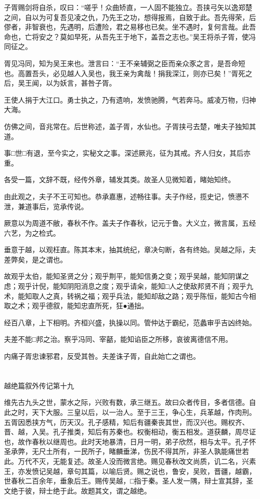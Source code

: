 \documentclass[12pt,UTF8]{ctexbook}
\begin{document}
子胥赐剑将自杀，叹曰：“嗟乎！众曲矫直，一人固不能独立。吾挟弓矢以逸郑楚之间，自以为可复吾见凌之仇，乃先王之功，想得报焉，自致于此。吾先得荣，后僇者，非智衰也，先遇明，后遭险，君之易移也已矣。坐不遇时，复何言哉。此吾命也，亡将安之？莫如早死，从吾先王于地下，盖吾之志也。”吴王将杀子胥，使冯同征之。

胥见冯同，知为吴王来也。泄言曰：“王不亲辅弼之臣而亲众豕之言，是吾命短也。高置吾头，必见越人入吴也，我王亲为禽哉！捐我深江，则亦已矣！”胥死之后，吴王闻，以为妖言，甚咎子胥。

王使人捐于大江口。勇士执之，乃有遗响，发愤驰腾，气若奔马。威凌万物，归神大海。

仿佛之间，音兆常在。后世称述，盖子胥，水仙也。子胥挟弓去楚，唯夫子独知其道。

事□世□有退，至今实之，实秘文之事。深述厥兆，征为其戒。齐人归女，其后亦重。

各受一篇，文辞不既，经传外章，辅发其类。故圣人见微知着，睹始知终。

由此观之，夫子不王可知也。恭承嘉惠，述畅往事。夫子作经，揽史记，愤懑不泄，兼道事后，览承传说。

厥意以为周道不敝，春秋不作。盖夫子作春秋，记元于鲁。大义立，微言属，五经六艺，为之检式。

垂意于越，以观枉直。陈其本末，抽其统纪，章决句断，各有终始。吴越之际，夫差弊矣，是之谓也。

故观乎太伯，能知圣贤之分；观乎荆平，能知信勇之变；观乎吴越，能知阴谋之虑；观乎计倪，能知阴阳消息之度；观乎请籴，能知□人之使敌邦贤不肖；观乎九术，能知取人之真，转祸之福；观乎兵法，能知却敌之路；观乎陈恒，能知古今相取之术；观乎德叙，能知忠直所死，狂●通拙。

经百八章，上下相明。齐桓兴盛，执操以同。管仲达于霸纪，范蠡审乎吉凶终始。

夫差不能□邦之治。察乎冯同、宰嚭，能知谄臣之所移，哀彼离德信不用。

内痛子胥忠谏邪君，反受其咎。夫差诛子胥，自此始亡之谓也。


\part{}

越绝篇叙外传记第十九

维先古九头之世，蒙水之际，兴败有数，承三继五。故曰众者传目，多者信德。自此之时，天下大服。三皇以后，以一治人。至于三王，争心生，兵革越，作肉刑。五胥因悉挟方气，历天汉。孔子感精，知后有疆秦丧其世，而汉兴也。赐权齐、晋、越，入吴。孔子推类，知后有苏秦也。权衡相动，衡五相发。道获麟，周尽证也，故作春秋以继周也。此时天地暴清，日月一明，弟子欣然，相与太平。孔子怀圣承弊，无尺土所有，一民所子，睹麟垂涕，伤民不得其所，非圣人孰能痛世若此。万代不灭，无能复述。故圣人没而微言绝。赐见春秋改文尚质，讥二名，兴素王，亦发愤记吴越，章句其篇，以喻后贤。赐之说也，鲁安，吴败，晋疆，越霸，世春秋二百余年，垂象后王。赐传吴越，□指于秦。圣人发一隅，辩士宣其辞，圣文绝于彼，辩士绝于此。故题其文，谓之越绝。
\end{document}
